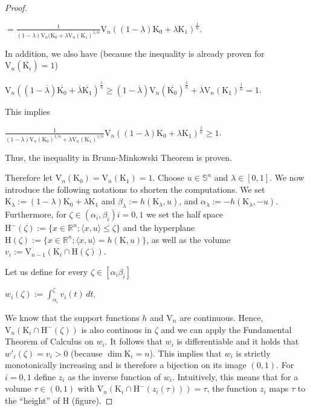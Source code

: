 \documentclass[a4paper]{book}
\numberwithin{theorem}{section}%
\begin{document}
\begin{proof}
\begin{center}
        $\displaystyle =\frac{1}{(1-\lambda)\mathrm{V}_{n}(\mathrm{K}_{0}+\lambda\mathrm{V}_{n}(\mathrm{K}_{1})^{1/n}}\mathrm{V}_{n}((1-\lambda)\mathrm{K}_{0}+\lambda\mathrm{K}_{1})^{\frac{1}{n}}$.
    \end{center}
    In addition, we also have (because the inequality is already proven for $\mathrm{V}_{n}(\overline{\mathrm{K}_{i}})=1$)
    \begin{center}
        $\displaystyle \mathrm{V}_{n}((1-\overline{\lambda})\overline{\mathrm{K}_{0}}+\overline{\lambda}\overline{\mathrm{K}_{1}})^{\frac{1}{n}}\geq(1-\overline{\lambda})\mathrm{V}_{n}(\overline{\mathrm{K}_{0}})^{\frac{1}{n}}+\overline{\lambda}\mathrm{V}_{n}(\mathrm{K}_{1})^{\frac{1}{n}}=1$.
    \end{center}
    This implies
    \begin{center}
        $\displaystyle \frac{1}{(1-\lambda)\mathrm{V}_{n}(\mathrm{K}_{0})^{1/n}+\lambda\mathrm{V}_{n}(\mathrm{K}_{1})^{1/n}}\mathrm{V}_{n}((1-\lambda)\mathrm{K}_{0}+\lambda\mathrm{K}_{1})^{\frac{1}{n}}\geq1$.
    \end{center}
    Thus, the inequality in Brunn-Minkowski Theorem is proven.

    Therefore let $\displaystyle \mathrm{V}_{n}(\mathrm{K}_{0})=\mathrm{V}_{n}(\mathrm{K}_{1})=1$. Choose $\displaystyle u\in\mathbb{S}^{n}$ and $\displaystyle \lambda\in[0,1]$. We now introduce the following notations to shorten the computations. We set $\displaystyle \mathrm{K}_{\lambda}:=(1-\lambda)\mathrm{K}_{0}+\lambda\mathrm{K}_{1}$ and $\displaystyle \beta_{\lambda}:=h(\mathrm{K}_{\lambda},u)$, and $\displaystyle \alpha_{\lambda}:=-h(\mathrm{K}_{\lambda},-u)$. Furthermore, for $\displaystyle \zeta\in(\alpha_{i},\beta_{i})$\;$i=0,1$ we set the half space $\mathrm{H}^{-}(\zeta):=\{x\in\mathbb{R}^{n};\langle x,u\rangle\leq\zeta\}$ and the hyperplane $\displaystyle \mathrm{H}(\zeta):=\{x\in\mathbb{R}^{n};\langle x,u\rangle=h(\mathrm{K},u)\}$, as well as the volume $\displaystyle v_{i}:=\mathrm{V}_{n-1}(\mathrm{K}_{i}\cap\mathrm{H}(\zeta))$.

    Let us define for every $\zeta\in[\alpha_{i}\beta_{i}]$
    \begin{center}
        $\displaystyle w_{i}(\zeta):=\int_{\alpha_{i}}^{\zeta}v_{i}(t)\,dt$.
    \end{center}
    We know that the support functions $h$ and $\mathrm{V}_{n}$ are continuous. Hence, $\mathrm{V}_{n}(\mathrm{K}_{i}\cap\mathrm{H}^{-}(\zeta))$ is also continous in $\zeta$ and we can apply the Fundamental Theorem of Calculus on $w_{i}$. It follows that $w_i$ is differentiable and it holds that $w'_{i}(\zeta)=v_{i}>0$ (because $\dim\mathrm{K}_{i}=n$). This implies that $w_{i}$ is strictly monotonically increasing and is therefore a bijection on its image $(0,1)$. For $i=0,1$ define $z_{i}$ as the inverse function of $w_{i}$. Intuitively, this means that for a volume $\tau\in(0,1)$ with $\mathrm{V}_{n}(\mathrm{K}_{i}\cap\mathrm{H}^{-}(z_{i}(\tau)))=\tau$, the function $z_{i}$ maps $\tau$ to the ``height'' of $\mathrm{H}$ (figure).


\end{proof}
\end{document}

